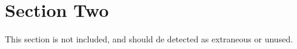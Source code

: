 \section{Section Two}
This section is not included, and should de detected as extraneous or
unused.

\lipsum[1] %
